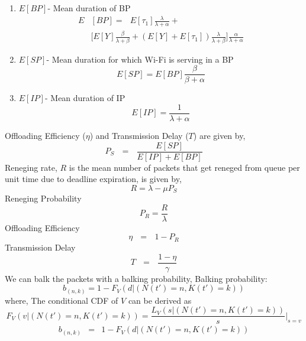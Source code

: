 \begin{enumerate}
\item $E[BP]$- Mean duration of BP\\
\begin{equation}\label{eq:6}
\begin{split}
E&[BP]=\textit{ }E[\tau_1]\frac{\lambda}{\lambda+\alpha}+\\
& \bigg[E[Y]\frac{\beta}{\lambda+\beta}+(E[Y]+E[\tau_1])\frac{\lambda}{\lambda+\beta}\bigg]\frac{\alpha}{\lambda+\alpha}
\end{split}
\end{equation}
\item  $E[SP]$- Mean duration for which Wi-Fi is serving in a BP\\
\begin{equation}\label{eq:7}
E[SP]=E[BP]\frac{\beta}{\beta+\alpha}
\end{equation}
\item  $E[IP]$- Mean duration of IP\\
\begin{equation}
E[IP]=\frac{1}{\lambda+\alpha}
\end{equation}
\end{enumerate}
Offloading Efficiency ($\eta$) and Transmission Delay ($T$) are given by,
\begin{equation}\label{eq:9}
P_S\textit{ }=\textit{ }\frac{E[SP]}{E[IP]+E[BP]}
\end{equation}
Reneging rate, $R$ is the mean number of packets that get reneged from queue per unit time due to deadline expiration, is given by,
\begin{equation}\label{eq:10}
R=\lambda-\mu P_S
\end{equation}
Reneging Probability
\begin{equation}\label{eq:10}
P_R=\frac{R}{\lambda}
\end{equation}
Offloading Efficiency  
\begin{equation}\label{eq:11}
\eta\textit{ }=\textit{ }1-P_R
\end{equation}
Transmission Delay 
\begin{equation}\label{eq:12}
T\textit{ }=\textit{ }\frac{1-\eta}{\gamma} 
\end{equation}
We can balk the packets with a balking probability,
Balking probability:
\begin{equation}\label{eq:18}
b_{(n, k)} =  1-F_{V}(d|(N(t')=n,K(t')=k))
\end{equation}
where, The conditional CDF of $V$ can be derived as
\begin{equation}\label{eq:17}
F_{V}(v|(N(t')=n,K(t')=k))=\frac{L_{V}(s|(N(t')=n,K(t')=k))}{s} \Big\rvert_{s=v}
\end{equation}
\begin{eqnarray}\label{eq:18}
b_{(n, k)} &=&  1-F_{V}(d|(N(t')=n,K(t')=k))
\end{eqnarray}

